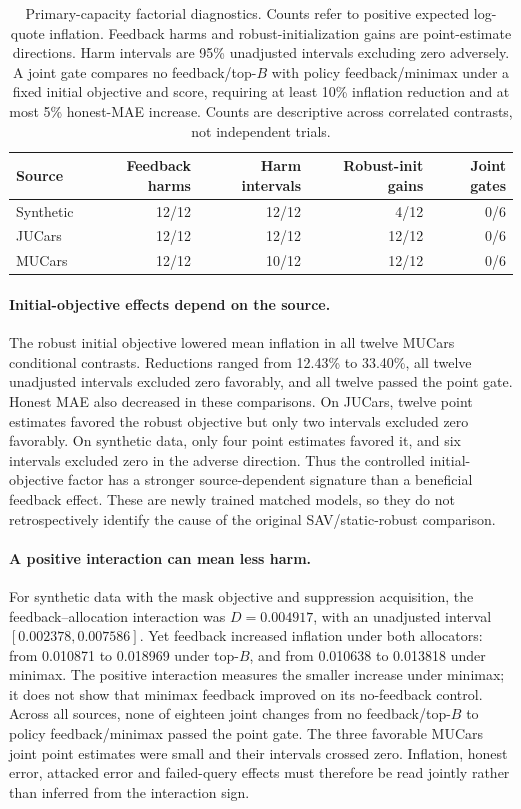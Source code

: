 \documentclass[11pt]{article}
\begin{document}
\begin{table}[ht]
\centering\small
\begin{tabular}{lrrrr}
\toprule
Source & Feedback harms & Harm intervals & Robust-init gains & Joint gates\\
\midrule
Synthetic & 12/12 & 12/12 & 4/12 & 0/6\\
JUCars & 12/12 & 12/12 & 12/12 & 0/6\\
MUCars & 12/12 & 10/12 & 12/12 & 0/6\\
\bottomrule
\end{tabular}
\caption{Primary-capacity factorial diagnostics. Counts refer to positive
expected log-quote inflation. Feedback harms and robust-initialization gains
are point-estimate directions. Harm intervals are 95\% unadjusted intervals
excluding zero adversely. A joint gate compares no feedback/top-$B$ with
policy feedback/minimax under a fixed initial objective and score, requiring
at least 10\% inflation reduction and at most 5\% honest-MAE increase.
Counts are descriptive across correlated contrasts, not independent trials.}
\end{table}

\paragraph{Initial-objective effects depend on the source.}
The robust initial objective lowered mean inflation in all twelve MUCars
conditional contrasts. Reductions ranged from 12.43\% to 33.40\%, all twelve
unadjusted intervals excluded zero favorably, and all twelve passed the point
gate. Honest MAE also decreased in these comparisons. On JUCars, twelve point
estimates favored the robust objective but only two intervals excluded zero
favorably. On synthetic data, only four point estimates favored it, and six
intervals excluded zero in the adverse direction. Thus the controlled
initial-objective factor has a stronger source-dependent signature than a
beneficial feedback effect. These are newly trained matched models, so they
do not retrospectively identify the cause of the original SAV/static-robust
comparison.

\paragraph{A positive interaction can mean less harm.}
For synthetic data with the mask objective and suppression acquisition, the
feedback--allocation interaction was $D=0.004917$, with an unadjusted interval
$[0.002378,0.007586]$. Yet feedback increased inflation under both allocators:
from 0.010871 to 0.018969 under top-$B$, and from 0.010638 to 0.013818 under
minimax. The positive interaction measures the smaller increase under minimax;
it does not show that minimax feedback improved on its no-feedback control.
Across all sources, none of eighteen joint changes from no feedback/top-$B$
to policy feedback/minimax passed the point gate. The three favorable MUCars
joint point estimates were small and their intervals crossed zero. Inflation,
honest error, attacked error and failed-query effects must therefore be read
jointly rather than inferred from the interaction sign.
\end{document}
